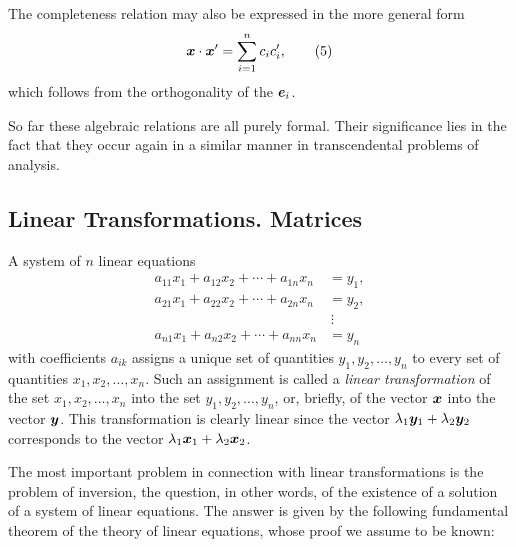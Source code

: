 The completeness relation may also be expressed in the more general form
\begin{equation*}
\bm{x}\cdot\bm{x}'=\sum_{i=1}^{n}c_i c'_i,
\tag{5}
\end{equation*}
which follows from the orthogonality of the $\bm{e}_i$.

So far these algebraic relations are all purely formal. Their significance lies in the fact that they occur again in a similar manner in transcendental problems of analysis.

\subsection{Linear Transformations. Matrices}
A system of $n$ linear equations
\begin{equation*}
\begin{aligned}
a_{11}x_1+a_{12}x_2+\cdots+a_{1n}x_n&=y_1,\\
a_{21}x_1+a_{22}x_2+\cdots+a_{2n}x_n&=y_2,\\
&\ \vdots\\
a_{n1}x_1+a_{n2}x_2+\cdots+a_{nn}x_n&=y_n
\end{aligned}
\tag{6}
\end{equation*}
with coefficients $a_{ik}$ assigns a unique set of quantities $y_1,y_2,\ldots,y_n$ to every set of quantities $x_1,x_2,\ldots,x_n$. Such an assignment is called a \emph{linear transformation} of the set $x_1,x_2,\ldots,x_n$ into the set $y_1,y_2,\ldots,y_n$, or, briefly, of the vector $\bm{x}$ into the vector $\bm{y}$. This transformation is clearly linear since the vector $\lambda_1\bm{y}_1+\lambda_2\bm{y}_2$ corresponds to the vector $\lambda_1\bm{x}_1+\lambda_2\bm{x}_2$.

The most important problem in connection with linear transformations is the problem of inversion, the question, in other words, of the existence of a solution of a system of linear equations. The answer is given by the following fundamental theorem of the theory of linear equations, whose proof we assume to be known:

